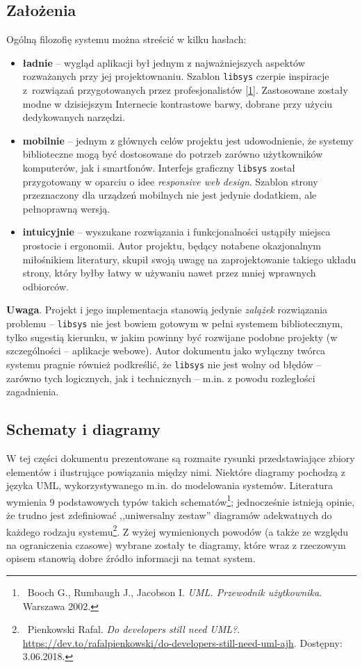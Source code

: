 \documentclass[12pt, a4paper]{article}
\begin{document}
\subsection{Założenia}
Ogólną filozofię systemu można streścić w kilku hasłach:

\begin{itemize}
    \item \textbf{ładnie} -- wygląd aplikacji był jednym z najważniejszych aspektów rozważanych przy jej projektownaniu. Szablon \texttt{libsys} czerpie inspiracje z~rozwiązań przygotowanych przez profesjonalistów \href{https://www.w3schools.com/w3css/tryw3css_templates_interior_design.htm}{[1]}. Zastosowane zostały modne w dzisiejszym Internecie kontrastowe barwy, dobrane przy użyciu dedykowanych narzędzi.
    \item \textbf{mobilnie} -- jednym z głównych celów projektu jest udowodnienie, że systemy biblioteczne mogą być dostosowane do potrzeb zarówno użytkowników komputerów, jak i smartfonów. Interfejs graficzny \texttt{libsys} został przygotowany w oparciu o idee \textit{responsive web design}. Szablon strony przeznaczony dla urządzeń mobilnych nie jest jedynie dodatkiem, ale pełnoprawną wersją.
    \item \textbf{intuicyjnie} -- wyszukane rozwiązania i funkcjonalności ustąpiły miejsca prostocie i ergonomii. Autor projektu, będący notabene okazjonalnym miłośnikiem literatury, skupił swoją uwagę na zaprojektowanie takiego układu strony, który byłby łatwy w używaniu nawet przez mniej wprawnych odbiorców.
\end{itemize}

\textbf{Uwaga}. Projekt i jego implementacja stanowią jedynie \textit{zalążek} rozwiązania problemu -- \texttt{libsys} nie jest bowiem gotowym w pełni systemem bibliotecznym, tylko sugestią kierunku, w jakim powinny być rozwijane podobne projekty (w szczególności -- aplikacje webowe). Autor dokumentu jako wyłączny twórca systemu pragnie również podkreślić, że \texttt{libsys} nie jest wolny od błędów -- zarówno tych logicznych, jak i technicznych -- m.in. z powodu rozległości zagadnienia.

\subsection{Schematy i diagramy}
W tej części dokumentu prezentowane są rozmaite rysunki przedstawiające zbiory elementów i ilustrujące powiązania między nimi. Niektóre diagramy pochodzą z języka UML, wykorzystywanego m.in. do modelowania systemów. Literatura wymienia 9 podstawowych typów takich schematów\footnote{\ Booch G., Rumbaugh J., Jacobson I. \textit{UML. Przewodnik użytkownika}. Warszawa 2002.}; jednocześnie istnieją opinie, że trudno jest zdefiniować ,,uniwersalny zestaw'' diagramów adekwatnych do każdego rodzaju systemu\footnote{\ Pienkowski Rafal. \textit{Do developers still need UML?}. \url{https://dev.to/rafalpienkowski/do-developers-still-need-uml-ajh}. Dostępny: 3.06.2018.}. Z wyżej wymienionych powodów (a także ze względu na ograniczenia czasowe) wybrane zostały te diagramy, które wraz z rzeczowym opisem stanowią dobre źródło informacji na temat system.
\end{document}
